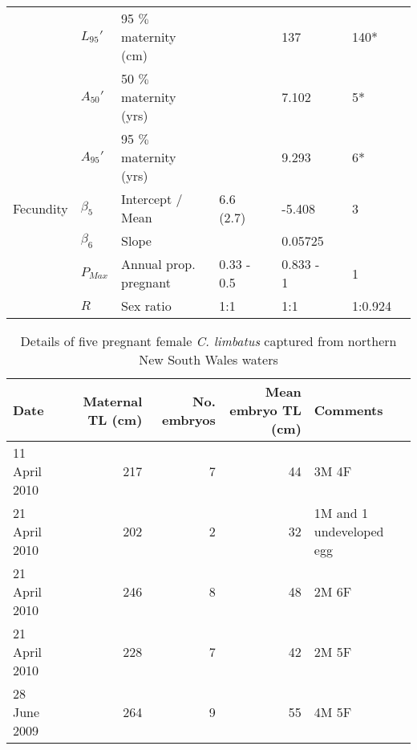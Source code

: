 \documentclass[]{article}
\begin{document}
\begin{landscape}
\begin{table}[ht]
\begin{tabular}{lllllllll}
   & $L_{95}\prime$ & 95 $\%$ maternity (cm) &  &  & 137 &  & 140* &  \\ 
   & $A_{50}\prime$ & 50 $\%$ maternity (yrs) &  &  & 7.102 &  & 5* &  \\ 
   & $A_{95}\prime$ & 95  $\%$ maternity (yrs) &  &  & 9.293 &  & 6* &  \\ 
  Fecundity & $\beta_5$ & Intercept / Mean & 6.6 (2.7) &  & -5.408 &  & 3 &  \\ 
   & $\beta_6$ & Slope &  &  & 0.05725 &  &  &  \\ 
   & $P_{Max}$ & Annual prop. pregnant & 0.33 - 0.5 &  & 0.833 - 1 &  & 1 &  \\ 
   & $R$ & Sex ratio & 1:1 &  & 1:1 &  & 1:0.924 &  \\ 
   \bottomrule
\end{tabular}
\end{table}


\end{landscape}

\newpage

\begin{table}[ht]
\centering
\caption{Details of five pregnant female \textit{C. limbatus} captured from northern New South Wales waters\newline} 
\begin{tabular}{lrrrl}
  \toprule
Date & Maternal TL (cm) & No. embryos & Mean embryo TL (cm) & Comments \\ 
  \midrule
11 April 2010 & 217 &   7 &  44 & 3M 4F \\ 
  21 April 2010 & 202 &   2 &  32 & 1M and 1 undeveloped egg \\ 
  21 April 2010 & 246 &   8 &  48 & 2M 6F \\ 
  21 April 2010 & 228 &   7 &  42 & 2M 5F \\ 
  28 June 2009 & 264 &   9 &  55 & 4M 5F \\ 
   \bottomrule
\end{tabular}
\end{table}
\end{document}

